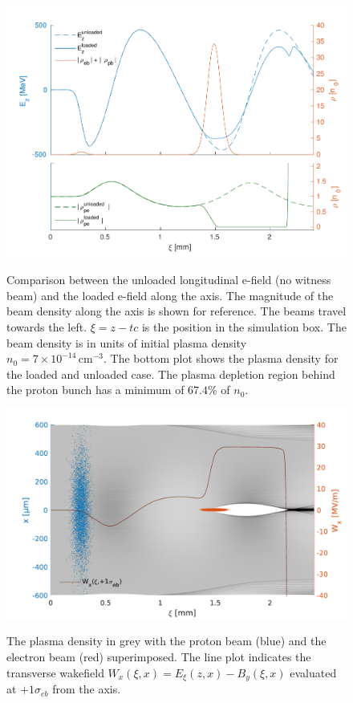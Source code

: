 \documentclass[aps,prstab,reprint,amsmath,amssymb,groupedaddress]{revtex4-1}
\newcommand{\unit}[1]{\,\mathrm{#1}}
\newcommand{\nexp}[1]{\times 10^{#1}}
\begin{document}
\begin{figure}[hbt]
    \includegraphics[width=0.99\linewidth,trim={4mm 0mm 4mm 0mm},clip]{figures/beamLoading}
    \label{Fig:BeamLoading}
    \caption{Comparison between the unloaded longitudinal e-field (no witness beam) and the loaded e-field along the
        axis. The magnitude of the beam density along the axis is shown for reference. The beams travel towards the
        left. $\xi = z - tc$ is the position in the simulation box. The beam density is in units of initial plasma
        density $n_{0} = 7\nexp{-14}\unit{cm}^{-3}$. The bottom plot shows the plasma density for the loaded and
        unloaded case. The plasma depletion region behind the proton bunch has a minimum of $67.4\%$ of $n_{0}$. }
\end{figure}

\begin{figure}[hbt]
    \includegraphics[width=0.99\linewidth,trim={4mm 0mm 4mm 0mm},clip]{figures/plasmaDenTWake}
    \label{Fig:PlasmaDenTWake}
    \caption{The plasma density in grey with the proton beam (blue) and the electron beam (red) superimposed. The line
        plot indicates the transverse wakefield $W_{x}(\xi,x) = E_{\xi}(z,x) - B_{y}(\xi,x)$ evaluated at
        $+1\sigma_{eb}$ from the axis.}
\end{figure}
\end{document}
